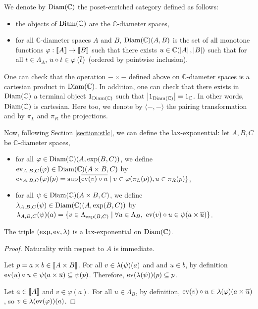 \begin{definition}
We denote by $\operatorname{Diam}(\mathbb{C})$ the poset-enriched category defined as follows: \begin{itemize}
\item the objects of $\operatorname{Diam}(\mathbb{C})$ are the $\mathbb{C}$-diameter spaces,
\item for all $\mathbb{C}$-diameter spaces $A$ and $B$, $\operatorname{Diam}(\mathbb{C})(A,B)$ is the set of all monotone functions $\varphi : \llbracket A \rrbracket \to \llbracket B \rrbracket$ such that there exists $u \in \mathbb{C}(\left\vert A\right\vert,\left\vert B\right\vert)$ such that for all $t \in \Lambda_A$, $u \circ t \in \varphi\left(\overline{t}\right)$ (ordered by pointwise inclusion).
\end{itemize}
\end{definition}

One can check that the operation $-\times-$ defined above on $\mathbb{C}$-diameter spaces is a cartesian product in $\operatorname{Diam}(\mathbb{C})$. In addition, one can check that there exists in $\operatorname{Diam}(\mathbb{C})$ a terminal object $1_{\operatorname{Diam}(\mathbb{C})}$ such that $\left\vert1_{\operatorname{Diam}(\mathbb{C})}\right\vert = 1_{\mathbb{C}}$. In other words, $\operatorname{Diam}(\mathbb{C})$ is cartesian. Here too, we denote by $\langle-,-\rangle$ the pairing transformation and by $\pi_L$ and $\pi_R$ the projections.


Now, following Section \ref{section:stlc}, we can define the lax-exponential: let $A,B,C$ be $\mathbb{C}$-diameter spaces, \begin{itemize}
\item for all $\varphi \in \operatorname{Diam}(\mathbb{C})(A, \exp(B, C))$, we define $\operatorname{ev}_{A,B,C}(\varphi) \in \operatorname{Diam}(\mathbb{C})\allowbreak(A \times B, C)$ by $\operatorname{ev}_{A,B,C}(\varphi)(p) = \sup\{ \overline{\operatorname{ev}(v) \circ u} \mid v \in \varphi(\pi_L(p)), u \in \pi_R(p) \}$,
\item for all $\psi \in \operatorname{Diam}(\mathbb{C})(A \times B, C)$, we define $\lambda_{A,B,C}(\psi) \in \operatorname{Diam}(\mathbb{C})(A,\allowbreak \exp(B, C))$ by $\lambda_{A,B,C}(\psi)(a) = \{ v \in \Lambda_{\exp(B, C)} \mid \forall u \in \Lambda_B,~ \operatorname{ev}(v) \circ u \in \psi(a \times \overline{u}) \}$.
\end{itemize}
 
 \begin{proposition} The triple $(\exp, \operatorname{ev}, \lambda)$ is a lax-exponential on $\operatorname{Diam}(\mathbb{C})$.
 \end{proposition}
 \begin{proof} Naturality with respect to $A$ is immediate.
 
Let $p = a \times b \in \llbracket A \times B \rrbracket$. For all $v \in \lambda(\psi)(a)$ and and $u \in b$, by definition $\operatorname{ev}(u) \circ u \in \psi(a \times \overline{u}) \subseteq \psi(p)$. Therefore, $\operatorname{ev}(\lambda(\psi))(p) \subseteq p$.
 
 Let $a \in \llbracket A \rrbracket$ and $v \in \varphi(a)$. For all $u \in \Lambda_B$,  by definition, $\operatorname{ev}(v) \circ u \in \lambda(\varphi)(a \times \overline{u})$, so $v \in \lambda(\operatorname{ev}(\varphi))(a)$.
\end{proof}
 
